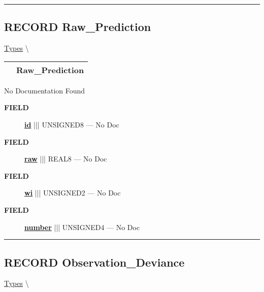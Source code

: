\rule{\linewidth}{0.5pt}
\subsection*{\textsf{\colorbox{headtoc}{\color{white} RECORD}
Raw\_Prediction}}

\hypertarget{ecldoc:logisticregression.types.raw_prediction}{}
\hspace{0pt} \hyperlink{ecldoc:LogisticRegression.Types}{Types} \textbackslash 

{\renewcommand{\arraystretch}{1.5}
\begin{tabularx}{\textwidth}{|>{\raggedright\arraybackslash}l|X|}
\hline
\hspace{0pt}\mytexttt{\color{red} } & \textbf{Raw\_Prediction} \\
\hline
\end{tabularx}
}

\par





No Documentation Found







\par
\begin{description}
\item [\colorbox{tagtype}{\color{white} \textbf{\textsf{FIELD}}}] \textbf{\underline{id}} ||| UNSIGNED8 --- No Doc
\item [\colorbox{tagtype}{\color{white} \textbf{\textsf{FIELD}}}] \textbf{\underline{raw}} ||| REAL8 --- No Doc
\item [\colorbox{tagtype}{\color{white} \textbf{\textsf{FIELD}}}] \textbf{\underline{wi}} ||| UNSIGNED2 --- No Doc
\item [\colorbox{tagtype}{\color{white} \textbf{\textsf{FIELD}}}] \textbf{\underline{number}} ||| UNSIGNED4 --- No Doc
\end{description}





\rule{\linewidth}{0.5pt}
\subsection*{\textsf{\colorbox{headtoc}{\color{white} RECORD}
Observation\_Deviance}}

\hypertarget{ecldoc:logisticregression.types.observation_deviance}{}
\hspace{0pt} \hyperlink{ecldoc:LogisticRegression.Types}{Types} \textbackslash 

